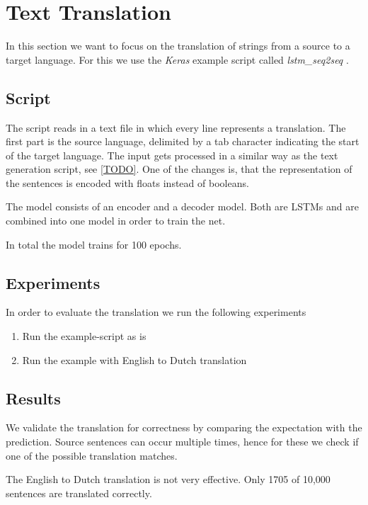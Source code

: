 \documentclass{article}[]
\begin{document}
\section{Text Translation}
\label{sec:trans}
In this section we want to focus on the translation of strings from a source to a target language.
For this we use the \emph{Keras} example script called \emph{lstm\_seq2seq} \cite{kerasexamples}.

\subsection{Script}
The script reads in a text file in which every line represents a translation.
The first part is the source language, delimited by a tab character indicating the start of the target language.
The input gets processed in a similar way as the text generation script, see \ref{TODO}.
One of the changes is, that the representation of the sentences is encoded with floats instead of booleans.

The model consists of an encoder and a decoder model.
Both are LSTMs and are combined into one model in order to train the net.

In total the model trains for 100 epochs.

\subsection{Experiments}
In order to evaluate the translation we run the following experiments

\begin{enumerate}
	\item{Run the example-script as is}
	\item{Run the example with English to Dutch translation}
\end{enumerate}

\subsection{Results}
We validate the translation for correctness by comparing the expectation with the prediction.
Source sentences can occur multiple times, hence for these we check if one of the possible translation matches.


The English to Dutch translation is not very effective.
Only 1705 of 10,000 sentences are translated correctly.
\end{document}
